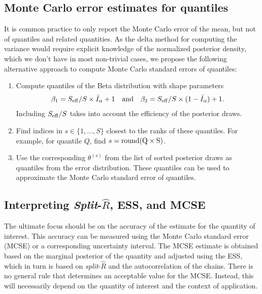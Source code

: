 \documentclass[american,]{article}
\begin{document}
\hypertarget{mcse}{%
\subsection{Monte Carlo error estimates for quantiles}\label{mcse}}

It is common practice to only report the Monte Carlo error of the mean,
but not of quantiles and related quantities. As the delta method for
computing the variance would require explicit knowledge of the
normalized posterior density, which we don't have in most non-trivial
cases, we propose the following alternative approach to compute Monte
Carlo standard errors of quantiles:

\begin{enumerate}
\def\labelenumi{\arabic{enumi}.}
\item
  Compute quantiles of the Beta distribution with shape parameters
  \begin{equation}
  \beta_1 = S_{\rm eff} / S \times \bar{I}_\alpha+1 \quad \text{and} \quad
  \beta_2 = S_{\rm eff} / S \times (1-\bar{I}_\alpha) + 1.
  \end{equation} Including \(S_{\rm eff}/S\) takes into account the
  efficiency of the posterior draws.
\item
  Find indices in \(s \in \{1,\ldots,S\}\) closest to the ranks of these
  quantiles. For example, for quantile \(Q\), find
  \(s = {\rm round(Q \times S)}\).
\item
  Use the corresponding \(\theta^{(s)}\) from the list of sorted
  posterior draws as quantiles from the error distribution. These
  quantiles can be used to approximate the Monte Carlo standard error of quantiles.
\end{enumerate}

\hypertarget{warning-thresholds}{%
\subsection{Interpreting \texorpdfstring{\emph{Split}-\(\widehat{R}\)}{Split-\textbackslash{}widehat\{R\}}, ESS, and MCSE}\label{warning-thresholds}}

The ultimate focus should be on the accuracy of the estimate for the
quantity of interest. This accuracy can be measured using the Monte Carlo
standard error (MCSE) or a corresponding uncertainty interval. The MCSE estimate is 
obtained based on the marginal posterior of the quantity and adjusted using the ESS,
which in turn is based on \emph{split}-\(\widehat{R}\) and the autocorrelation
of the chains. There is no general rule that determines an acceptable value 
for the MCSE. Instead, this will necessarily depend on the quantity of interest 
and the context of application.
\end{document}
